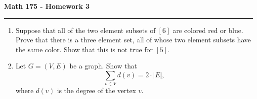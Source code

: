 \documentclass[11pt,letterpaper]{report}
\begin{document}
\begin{center}
{\bf \Large Math 175 - Homework 3}
\vspace{0.2cm}
\hrule
\end{center}

\begin{enumerate}
	\item Suppose that all of the two element subsets of $[6]$ are colored red or blue. Prove that there is a three element set, all of whose two element subsets have the same color. Show that this is not true for $[5]$.
	\vfill

	\item Let $G = (V, E)$ be a graph. Show that
	\[
	\sum_{v\in V}d(v) = 2\cdot |E|,
	\]
	where $d(v)$ is the degree of the vertex $v$.
	\vfill
\end{enumerate}
\end{document}
